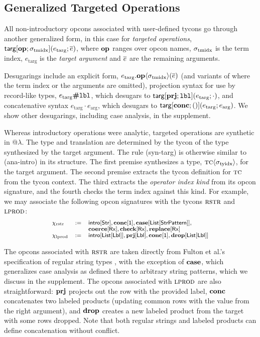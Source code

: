 \documentclass[10pt,preprint]{sigplanconf}
\begin{document}
\subsection{Generalized Targeted Operations} 
All non-introductory opcons associated with user-defined tycons go through another generalized form, in this case for \emph{targeted operations}, ${\sf targ}[\textbf{op}; \sigma_\text{tmidx}](e_\text{targ}; \overline{e})$, where $\textbf{op}$ ranges over opcon names, ${\sigma_\text{tmidx}}$ is the term index, $e_\text{targ}$ is the \emph{target argument} and $\overline{e}$ are the remaining arguments. 

Desugarings include an explicit form, $e_\text{targ}.\textbf{op}\langle\sigma_\text{tmidx}\rangle(\overline{e})$ (and variants of where the term index or the arguments are omitted), projection syntax for use by record-like types, $e_\text{targ}\textbf{\#}\texttt{lbl}$, which desugars to ${\sf targ}[\textbf{prj}; \texttt{lbl}](e_\text{targ}; \cdot)$, and concatenative syntax $e_\text{targ} \cdot e_\text{arg}$, which desugars to ${\sf targ}[\textbf{conc}; ()](e_\text{targ}; e_\text{arg})$. We show other desugarings, including case analysis, in the supplement.


Whereas introductory operations were analytic, targeted operations are synthetic in @$\lambda$. The type and translation are determined by the tycon of the type synthesized by the target argument. The rule (syn-targ) is otherwise similar to (ana-intro) in its structure. The first premise synthesizes a type, ${\textsc{tc}}\langle\sigma_\text{tyidx}\rangle$, for the target argument. The second premise extracts the tycon definition for $\textsc{tc}$ from the tycon context. The third extracts the \emph{operator index kind} from its opcon signature, and the fourth checks the term index against this kind. For example, we may associate the following opcon signatures with the tycons $\textsc{rstr}$ and $\textsc{lprod}$:\[\small
\begin{array}{lcl}
\chi_\text{rstr} & := & \keyw{intro}[\keyw{Str}], \opsig{\opname{conc}}{\kunit}, \opsig{\opname{case}}{\klist{\keyw{StrPattern}}},  \\
& & \opsig{\opname{coerce}}{\krx}, \opsig{\opname{check}}{\krx}, \opsig{\opname{replace}}{\krx}\\
\chi_\text{lprod} & := & \keyw{intro}[\klist{\klbl}], \opsig{\opname{prj}}{\klbl}, \opsig{\opname{conc}}{\kunit}, \opsig{\opname{drop}}{\klist{\klbl}}
\end{array}
\]

The opcons associated with $\textsc{rstr}$ are taken directly from Fulton et al.'s specification of regular string types \cite{sanitation-psp14}, with the exception of $\textbf{case}$, which generalizes case analysis as defined there to arbitrary string patterns, which we discuss in the supplement. The opcons associated with $\textsc{lprod}$ are also straightforward: $\textbf{prj}$ projects out the row with the provided label, $\textbf{conc}$ concatenates two labeled products (updating common rows with the value from the right argument), and $\textbf{drop}$ creates a new labeled product from the target with some rows dropped. Note that both regular strings and labeled products can define concatenation without conflict. %
\end{document}
